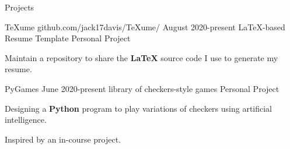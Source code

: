 \documentclass{resume} %
\begin{document}
\begin{Section} {Projects}
	\begin{Project} {TeXume}
		{
			{github.com/jack17davis/TeXume/}}
		{August 2020-present}
		{LaTeX-based Resume Template}
		{Personal Project}
		\item Maintain a repository to share the \textbf{LaTeX} source code I use to generate my resume.
	\end{Project}

	\begin{Project} {PyGames}
		{}
		{June 2020-present}
		{library of checkers-style games}
		{Personal Project}
		\item Designing a \textbf{Python} program to play variations of checkers using artificial intelligence.
		\item Inspired by an in-course project.
	\end{Project}

\begin{comment}
	\begin{Project} {Shelley Checker}
		{\URL{https://bitbucket.org/safeiot/shelley-checker/src/master/}
		{bitbucket.org/safeiot/shelley-checker/src/master/}}
		{July 2020-present}
		{System Integration Checker}
		{Research associated with University of Massachusetts Boston}
		Helps users to plan systems and their operations, and check for possible integration errors using automata theory. I am currently adding conditional logic into the language using \textbf{Python}. 
	\end{Project}
\end{comment}
\begin{comment}
		\begin{Project}{Flex Break} {Group Project at Google JTerm Program} {January 2020}
			\item Used \textbf{Java} and \textbf{Android Studio} to create an app that allows the user to set alarms and review a list of stretches. We used \textbf{Git} to manage files.
		\end{Project}
\end{comment}
\end{Section}
\end{document}
